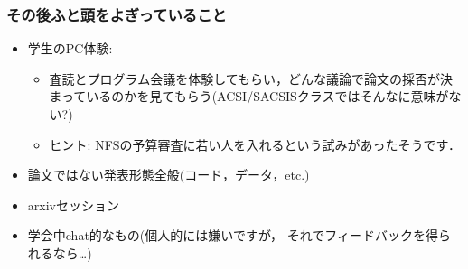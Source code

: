 \documentclass[12pt,dvipdfmx]{beamer}
\begin{document}
\begin{frame}
\frametitle{その後ふと頭をよぎっていること}

\begin{itemize}
\item 学生のPC体験: 
  \begin{itemize}
  \item 査読とプログラム会議を体験してもらい，どんな議論で論文の採否が決まっているのかを見てもらう(ACSI/SACSISクラスではそんなに意味がない?)
  \item ヒント: NFSの予算審査に若い人を入れるという試みがあったそうです．
  \end{itemize}

\item 論文ではない発表形態全般(コード，データ，etc.)

\item arxivセッション

\item 学会中chat的なもの(個人的には嫌いですが，
  それでフィードバックを得られるなら\ldots)
\end{itemize}
\end{frame}
\end{document}
